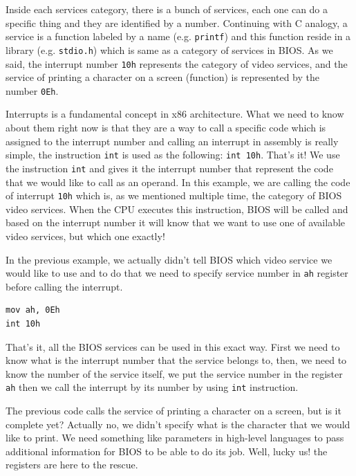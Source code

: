 Inside each services category, there is a bunch of services, each one
can do a specific thing and they are identified by a number. Continuing
with C analogy, a service is a function labeled by a name (e.g.
\lstinline!printf!) and this function reside in a library (e.g.
\lstinline!stdio.h!) which is same as a category of services in BIOS. As
we said, the interrupt number \lstinline!10h! represents the category of
video services, and the service of printing a character on a screen
(function) is represented by the number \lstinline!0Eh!.

Interrupts is a fundamental concept in x86 architecture. What we need to
know about them right now is that they are a way to call a specific code
which is assigned to the interrupt number and calling an interrupt in
assembly is really simple, the instruction \lstinline!int! is used as
the following: \lstinline!int 10h!. That's it! We use the instruction
\lstinline!int! and gives it the interrupt number that represent the
code that we would like to call as an operand. In this example, we are
calling the code of interrupt \lstinline!10h! which is, as we mentioned
multiple time, the category of BIOS video services. When the CPU
executes this instruction, BIOS will be called and based on the
interrupt number it will know that we want to use one of available video
services, but which one exactly!

In the previous example, we actually didn't tell BIOS which video
service we would like to use and to do that we need to specify service
number in \lstinline!ah! register before calling the interrupt.

\begin{lstlisting}
mov ah, 0Eh
int 10h
\end{lstlisting}

That's it, all the BIOS services can be used in this exact way. First we
need to know what is the interrupt number that the service belongs to,
then, we need to know the number of the service itself, we put the
service number in the register \lstinline!ah! then we call the interrupt
by its number by using \lstinline!int! instruction.

The previous code calls the service of printing a character on a screen,
but is it complete yet? Actually no, we didn't specify what is the
character that we would like to print. We need something like parameters
in high-level languages to pass additional information for BIOS to be
able to do its job. Well, lucky us! the registers are here to the
rescue.

